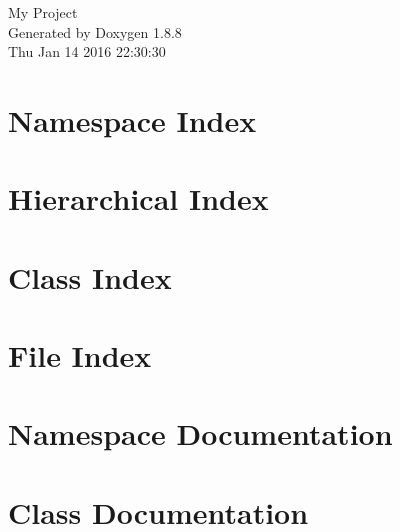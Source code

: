 \documentclass[twoside]{book}
\newcommand{\+}{\discretionary{\mbox{\scriptsize$\hookleftarrow$}}{}{}}
\newcommand{\clearemptydoublepage}{%
  \newpage{\pagestyle{empty}\cleardoublepage}%
}
\begin{document}
\hypersetup{pageanchor=false,
             bookmarks=true,
             bookmarksnumbered=true,
             pdfencoding=unicode
            }
\begin{titlepage}
\vspace*{7cm}
\begin{center}%
{\Large My Project }\\
\vspace*{1cm}
{\large Generated by Doxygen 1.8.8}\\
\vspace*{0.5cm}
{\small Thu Jan 14 2016 22:30:30}\\
\end{center}
\end{titlepage}
\clearemptydoublepage
\tableofcontents
\clearemptydoublepage
{}
\hypersetup{pageanchor=true}

\chapter{Namespace Index}

\chapter{Hierarchical Index}

\chapter{Class Index}

\chapter{File Index}

\chapter{Namespace Documentation}




\chapter{Class Documentation}











\end{document}
